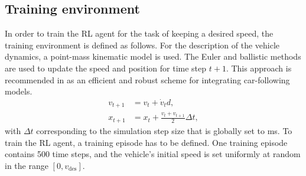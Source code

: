 \documentclass[review]{elsarticle}
\providecommand{\sub}[1]{_{\mathrm{#1}}}  %
\providecommand{\3}{{\ss}}
\begin{document}
	
	\subsection{Training environment}
	\label{training_environment1}
	In order to train the RL agent for the task of keeping a desired
	speed, the training environment is defined as follows. For the description of the vehicle dynamics, a point-mass kinematic model is used. The Euler and ballistic methods are used to update the speed and position for time step $t + 1$. This approach is recommended in \cite{numericalUpdateMethodsTreiber} as an efficient
	and robust scheme for integrating car-following models.	
	\begin{align}
	v_{t+1} &= v_{t} + \dot{v}_{t} d, \\
	x_{t+1} &= x_{t} + \frac{v_{t} + v_{t+1}}{2} \Delta t,
	\end{align}
	with $\Delta t$ corresponding to the simulation step size that is globally
	set to \unit[100]{ms}. To train the RL agent, a training episode has to be defined. One training episode contains 500 time steps, and the vehicle's initial speed is set uniformly at random in the range $[0,v\sub{des}]$.
	
\end{document}
